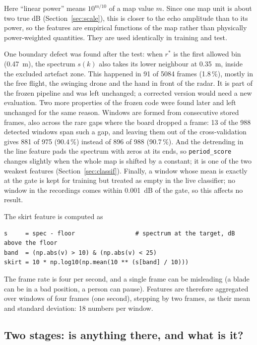 \documentclass[11pt,a4paper]{article}
\begin{document}
Here ``linear power'' means $10^{m/10}$ of a map value $m$. Since one map unit is about two true dB (Section~\ref{sec:scale}), this is closer to the echo amplitude than to its power, so the features are empirical functions of the map rather than physically power-weighted quantities. They are used identically in training and test.

One boundary defect was found after the test: when $r^\ast$ is the first allowed bin (\SI{0.47}{m}), the spectrum $s(k)$ also takes its lower neighbour at \SI{0.35}{m}, inside the excluded artefact zone. This happened in 91 of 5084 frames (1.8\,\%), mostly in the free flight, the swinging drone and the hand in front of the radar. It is part of the frozen pipeline and was left unchanged; a corrected version would need a new evaluation. Two more properties of the frozen code were found later and left unchanged for the same reason. Windows are formed from consecutive stored frames, also across the rare gaps where the board dropped a frame: 13 of the 988 detected windows span such a gap, and leaving them out of the cross-validation gives 881 of 975 (90.4\,\%) instead of 896 of 988 (90.7\,\%). And the detrending in the line feature pads the spectrum with zeros at its ends, so \texttt{period\_score} changes slightly when the whole map is shifted by a constant; it is one of the two weakest features (Section~\ref{sec:classif}). Finally, a window whose mean is exactly at the gate is kept for training but treated as empty in the live classifier; no window in the recordings comes within \SI{0.001}{dB} of the gate, so this affects no result.

The skirt feature is computed as
\begin{lstlisting}
s     = spec - floor                 # spectrum at the target, dB above the floor
band  = (np.abs(v) > 10) & (np.abs(v) < 25)
skirt = 10 * np.log10(np.mean(10 ** (s[band] / 10)))
\end{lstlisting}
The frame rate is four per second, and a single frame can be misleading (a blade can be in a bad position, a person can pause). Features are therefore aggregated over windows of four frames (one second), stepping by two frames, as their mean and standard deviation: 18 numbers per window.

\subsection{Two stages: is anything there, and what is it?}
\end{document}
